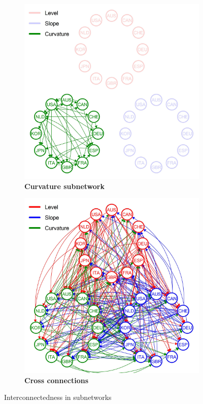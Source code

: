 \documentclass[12pt,bibliography=totoc]{article}
\begin{document}
\begin{figure}[H]
  \medskip

  \begin{subfigure}[t]{.5\textwidth}
    \centering
    \includegraphics[width=\linewidth]{curvatureOnly_1998-09-30_2021-12-29_TY_fix}
    \caption{\textbf{Curvature subnetwork}}
\label{fig:curvatureSubnetwork}
  \end{subfigure}
  \hfill
  \begin{subfigure}[t]{.5\textwidth}
    \centering
    \includegraphics[width=\linewidth]{innerEmpty_1998-09-30_2021-12-29_TY_fix}
    \caption{\textbf{Cross connections}}
\label{fig:crossConnections}
  \end{subfigure}
  \caption{Interconnectedness in subnetworks}
\label{fig:interrconnectednessInSubnetworks}


\end{figure}
\end{document}
